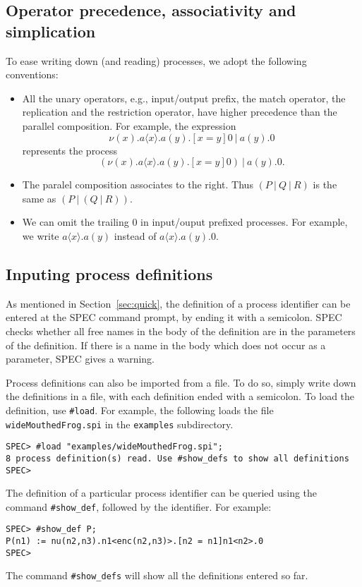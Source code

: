 \documentclass{article}
\begin{document}
\subsection{Operator precedence, associativity and simplication}

To ease writing down (and reading) processes, we adopt the following conventions:
\begin{itemize}
\item All the unary operators, e.g., input/output prefix, the match operator, the replication
and the restriction operator, have higher precedence than the parallel composition.
For example, the expression
$$
\nu (x). a\langle x \rangle. a(y).[x=y]0 ~ | ~ a(y).0
$$
represents the process
$$
(\nu (x). a\langle x \rangle. a(y).[x=y]0) ~ | ~ a(y).0.
$$
\item The paralel composition associates to the right. Thus $(P ~|~ Q ~|~ R)$ is
the same as $(P~|~ (Q~|~ R)).$

\item We can omit the trailing $0$ in input/ouput prefixed processes.
For example, we write $a\langle x \rangle.a(y)$ instead of 
$a\langle x \rangle.a(y).0$.
\end{itemize}

\subsection{Inputing process definitions}

As mentioned in Section~\ref{sec:quick}, the definition of a process identifier can be entered at the SPEC
command prompt, by ending it with a semicolon.
SPEC checks whether all free names in the body of the definition are in the
parameters of the definition. If there is a name in the body which does not occur as a parameter, SPEC
gives a warning. 

Process definitions can also be imported from a file. 
To do so, simply write down the definitions in a file, with each definition ended with a semicolon.
To load the definition, use \texttt{\#load}. For example, the following loads the
file \texttt{wideMouthedFrog.spi} in the \texttt{examples} subdirectory. 
\begin{verbatim}
SPEC> #load "examples/wideMouthedFrog.spi";
8 process definition(s) read. Use #show_defs to show all definitions
SPEC> 
\end{verbatim}
The definition of a particular process identifier can be queried using
the command \texttt{\#show\_def}, followed by the identifier.
For example:
\begin{verbatim}
SPEC> #show_def P;
P(n1) := nu(n2,n3).n1<enc(n2,n3)>.[n2 = n1]n1<n2>.0
SPEC> 
\end{verbatim}
The command \texttt{\#show\_defs} will show all the definitions entered so far. 
\end{document}
